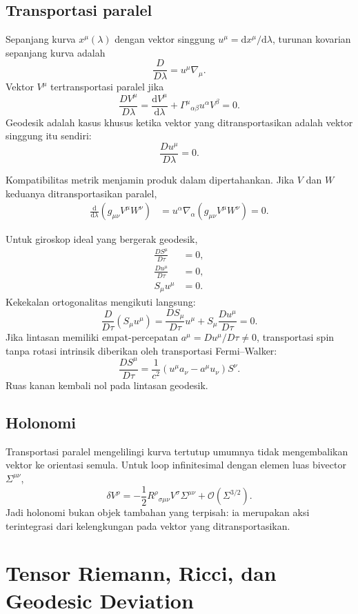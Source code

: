 \documentclass[12pt,a4paper]{report}
\newcommand{\dd}{\mathrm{d}}
\newcommand{\order}{\mathcal{O}}
\begin{document}
\section{Transportasi paralel}

Sepanjang kurva $x^\mu(\lambda)$ dengan vektor singgung
$u^\mu=\dd x^\mu/\dd\lambda$, turunan kovarian sepanjang kurva adalah
\[
 \frac{D}{D\lambda}=u^\mu\nabla_\mu.
\]
Vektor $V^\mu$ tertransportasi paralel jika
\[
 \boxed{
 \frac{DV^\mu}{D\lambda}
 =\frac{\dd V^\mu}{\dd\lambda}
 +\Gamma^\mu{}_{\alpha\beta}u^\alpha V^\beta=0}.
\]
Geodesik adalah kasus khusus ketika vektor yang ditransportasikan adalah vektor
singgung itu sendiri:
\[
 \frac{Du^\mu}{D\lambda}=0.
\]

Kompatibilitas metrik menjamin produk dalam dipertahankan. Jika $V$ dan $W$
keduanya ditransportasikan paralel,
\begin{align}
 \frac{\dd}{\dd\lambda}(g_{\mu\nu}V^\mu W^\nu)
 &=u^\alpha\nabla_\alpha(g_{\mu\nu}V^\mu W^\nu)=0.
\end{align}

Untuk giroskop ideal yang bergerak geodesik,
\begin{align}
 \frac{DS^\mu}{D\tau}&=0,\\
 \frac{Du^\mu}{D\tau}&=0,\\
 S_\mu u^\mu&=0.
\end{align}
Kekekalan ortogonalitas mengikuti langsung:
\[
 \frac{D}{D\tau}(S_\mu u^\mu)
 =\frac{DS_\mu}{D\tau}u^\mu+S_\mu\frac{Du^\mu}{D\tau}=0.
\]
Jika lintasan memiliki empat-percepatan $a^\mu=Du^\mu/D\tau\ne0$, transportasi
spin tanpa rotasi intrinsik diberikan oleh transportasi Fermi--Walker:
\[
 \frac{DS^\mu}{D\tau}
 =\frac{1}{c^2}(u^\mu a_\nu-a^\mu u_\nu)S^\nu.
\]
Ruas kanan kembali nol pada lintasan geodesik.

\section{Holonomi}

Transportasi paralel mengelilingi kurva tertutup umumnya tidak mengembalikan vektor
ke orientasi semula. Untuk loop infinitesimal dengan elemen luas bivector
$\Sigma^{\mu\nu}$,
\[
 \delta V^\rho
 =-\frac12R^\rho{}_{\sigma\mu\nu}V^\sigma\Sigma^{\mu\nu}
 +\order(\Sigma^{3/2}).
\]
Jadi holonomi bukan objek tambahan yang terpisah: ia merupakan aksi terintegrasi
dari kelengkungan pada vektor yang ditransportasikan.

\chapter{Tensor Riemann, Ricci, dan Geodesic Deviation}
\end{document}

